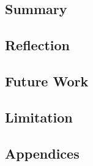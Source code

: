 \documentclass{l4proj}
\begin{document}
\section{Summary}
\section{Reflection}
\section{Future Work}
\section{Limitation}

%
% 

\begin{appendices}
\chapter{Appendices}
\end{appendices}






\end{document}
